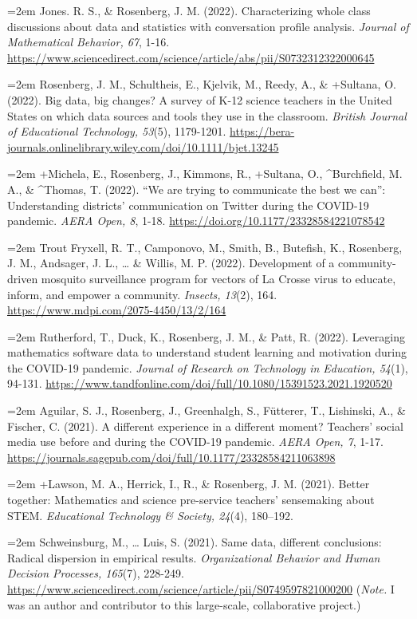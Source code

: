 \documentclass[
  14,
]{article}
\begin{document}
\hangindent=2em Jones. R. S., \& Rosenberg, J. M. (2022). Characterizing
whole class discussions about data and statistics with conversation
profile analysis. \emph{Journal of Mathematical Behavior, 67}, 1-16.
\url{https://www.sciencedirect.com/science/article/abs/pii/S0732312322000645}

\hangindent=2em Rosenberg, J. M., Schultheis, E., Kjelvik, M., Reedy,
A., \& +Sultana, O. (2022). Big data, big changes? A survey of K-12
science teachers in the United States on which data sources and tools
they use in the classroom. \emph{British Journal of Educational
Technology, 53}(5), 1179-1201.
\url{https://bera-journals.onlinelibrary.wiley.com/doi/10.1111/bjet.13245}

\hangindent=2em +Michela, E., Rosenberg, J., Kimmons, R., +Sultana, O.,
\^{}Burchfield, M. A., \& \^{}Thomas, T. (2022). ``We are trying to
communicate the best we can'': Understanding districts' communication on
Twitter during the COVID-19 pandemic. \emph{AERA Open, 8}, 1-18.
\url{https://doi.org/10.1177/23328584221078542}

\hangindent=2em Trout Fryxell, R. T., Camponovo, M., Smith, B.,
Butefish, K., Rosenberg, J. M., Andsager, J. L., \ldots{} \& Willis, M.
P. (2022). Development of a community-driven mosquito surveillance
program for vectors of La Crosse virus to educate, inform, and empower a
community. \emph{Insects, 13}(2), 164.
\url{https://www.mdpi.com/2075-4450/13/2/164}

\hangindent=2em Rutherford, T., Duck, K., Rosenberg, J. M., \& Patt, R.
(2022). Leveraging mathematics software data to understand student
learning and motivation during the COVID-19 pandemic. \emph{Journal of
Research on Technology in Education, 54}(1), 94-131.
\url{https://www.tandfonline.com/doi/full/10.1080/15391523.2021.1920520}

\hangindent=2em Aguilar, S. J., Rosenberg, J., Greenhalgh, S., Fütterer,
T., Lishinski, A., \& Fischer, C. (2021). A different experience in a
different moment? Teachers' social media use before and during the
COVID-19 pandemic. \emph{AERA Open, 7}, 1-17.
\url{https://journals.sagepub.com/doi/full/10.1177/23328584211063898}

\hangindent=2em +Lawson, M. A., Herrick, I., R., \& Rosenberg, J. M.
(2021). Better together: Mathematics and science pre-service teachers'
sensemaking about STEM. \emph{Educational Technology \& Society, 24}(4),
180--192.

\hangindent=2em Schweinsburg, M., \ldots{} Luis, S. (2021). Same data,
different conclusions: Radical dispersion in empirical results.
\emph{Organizational Behavior and Human Decision Processes, 165}(7),
228-249.
\url{https://www.sciencedirect.com/science/article/pii/S0749597821000200}
(\emph{Note.} I was an author and contributor to this large-scale,
collaborative project.)
\end{document}
